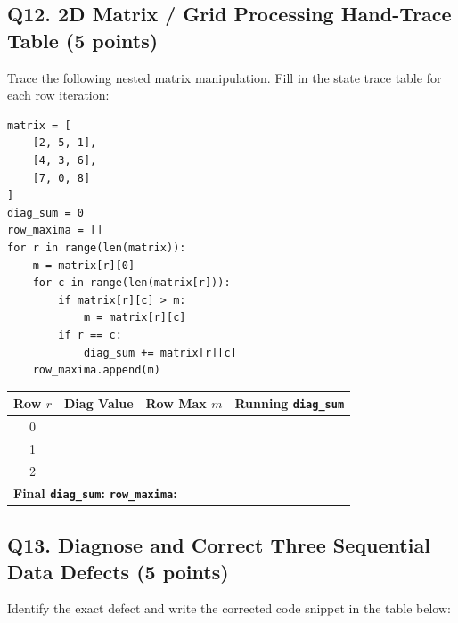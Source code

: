 \documentclass[11pt,a4paper]{article}
\begin{document}
\subsection*{Q12. 2D Matrix / Grid Processing Hand-Trace Table (5 points)}
Trace the following nested matrix manipulation. Fill in the state trace table for each row iteration:

\begin{minipage}[t]{0.45\textwidth}
\begin{lstlisting}
matrix = [
    [2, 5, 1],
    [4, 3, 6],
    [7, 0, 8]
]
diag_sum = 0
row_maxima = []
for r in range(len(matrix)):
    m = matrix[r][0]
    for c in range(len(matrix[r])):
        if matrix[r][c] > m:
            m = matrix[r][c]
        if r == c:
            diag_sum += matrix[r][c]
    row_maxima.append(m)
\end{lstlisting}
\end{minipage}%
\hfill
\begin{minipage}[t]{0.52\textwidth}
\centering
\footnotesize
\setlength{\tabcolsep}{3.5pt}
\begin{tabular}{|c|c|c|c|}
\hline
\textbf{Row $r$} & \textbf{Diag Value} & \textbf{Row Max $m$} & \textbf{Running \texttt{diag\_sum}} \\
\hline
0 & & & \\[1.5mm]
\hline
1 & & & \\[1.5mm]
\hline
2 & & & \\[1.5mm]
\hline
\multicolumn{4}{|l|}{\textbf{Final \texttt{diag\_sum}:} \dotfill{} \textbf{\texttt{row\_maxima}:} \dotfill{}} \\[1.5mm]
\hline
\end{tabular}
\end{minipage}

\vspace{1mm}
\subsection*{Q13. Diagnose and Correct Three Sequential Data Defects (5 points)}
Identify the exact defect and write the corrected code snippet in the table below:
\end{document}
